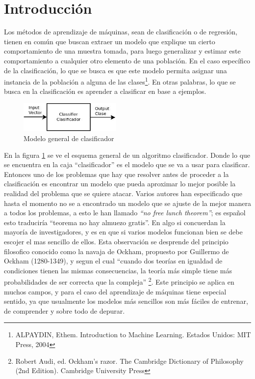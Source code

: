 \documentclass[a4paper, 11pt, oneside]{report}
\begin{document}
\section{Introducción}

Los métodos de aprendizaje de máquinas, sean de clasificación o de regresión, tienen en común que buscan extraer un modelo que explique un cierto comportamiento de una muestra tomada, para luego generalizar y estimar este comportamiento a cualquier otro elemento de una población. En el caso específico de la clasificación, lo que se busca es que este modelo permita asignar una instancia de la población a alguna de las clases\footnote{ALPAYDIN, Ethem. Introduction to Machine Learning. Estados Unidos: MIT Press, 2004}. En otras palabras, lo que se busca en la clasificación es aprender a clasificar en base a ejemplos.

	\begin{figure}[htb]
	\begin{center}
	\leavevmode
	\includegraphics[width=5cm]{diagrams/classifier1.jpg}
	\end{center}
	\caption{Modelo general de clasificador}
	\label{fig:classif1}
	\end{figure}

En la figura \ref{fig:classif1} se ve el esquema general de un algoritmo clasificador. Donde lo que se encuentra en la caja ``clasificador'' es el modelo que se va a usar para clasificar. Entonces uno de los problemas que hay que resolver antes de proceder a la clasificación es encontrar un modelo que pueda aproximar lo mejor posible la realidad del problema que se quiere atacar. Varios autores han especificado que hasta el momento no se a encontrado un modelo que se ajuste de la mejor manera a todos los problemas, a esto le han llamado {\it ``no free lunch theorem''}; es español esto traduciría ``teorema no hay almuezo gratis''. En algo si concuerdan la mayoría de investigadores, y es en que si varios modelos funcionan bien se debe escojer el mas sencillo de ellos. Esta observación se desprende del principio filosofico conocido como la navaja de Ockham, propuesto por Guillermo de Ockham (1280-1349), y segun el cual ``cuando dos teorías en igualdad de condiciones tienen las mismas consecuencias, la teoría más simple tiene más probabilidades de ser correcta que la compleja'' \footnote{Robert Audi, ed. Ockham's razor. The Cambridge Dictionary of Philosophy (2nd Edition). Cambridge University Press}. Este principio se aplica en muchos campos, y para el caso del aprendizaje de máquinas tiene especial sentido, ya que usualmente los modelos más sencillos son más fáciles de entrenar, de comprender y sobre todo de depurar.
\end{document}
